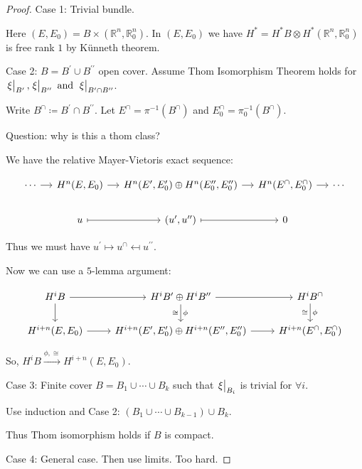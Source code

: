 \documentclass{article}
\theoremstyle{definition}
\begin{document}
    \begin{proof}
        Case 1: Trivial bundle.

        Here \((E, E_0) = B \times (\mathbb{R}^n , \mathbb{R}^n_0)\). In \((E,E_0)\) we have \(H^{\ast} = H^{\ast} B \otimes H^{\ast} (\mathbb{R}^n, \mathbb{R}^n_0)\) is free rank \(1\) by K\"unneth theorem.

        Case 2: \(B = B^{\prime} \cup B^{\prime\prime}\) open cover. Assume Thom Isomorphism Theorem holds for \(\eval{\xi}_{B^{\prime}},\eval{\xi}_{B^{\prime\prime}} \text{ and } \eval{\xi}_{B^{\prime} \cap B^{\prime\prime}}\).
        
        Write \(B^\cap \coloneqq B^{\prime} \cap B^{\prime\prime}\). Let \(E^\cap = \pi ^{-1} (B^\cap)\) and \(E_0^\cap = \pi_0 ^{-1} (B^\cap)\).
        
        Question: why is this a thom class?

        We have the relative Mayer-Vietoris exact sequence:

        \[
            \begin{tikzcd}[column sep = small]
                \cdots \ar[r] & H^n(E,E_0) \ar[r] & H^n(E^{\prime}, E^{\prime}_0) \oplus H^n(E^{\prime\prime}_0 ,  E^{\prime\prime} _0) \ar[r] & H^n(E^\cap , E_0^\cap) \ar[r] & \cdots \\
                & u \ar[r, mapsto] & (u^{\prime}, u^{\prime\prime}) \ar[r, mapsto] & 0
            \end{tikzcd}
        \]

        Thus we must have \(u^{\prime} \mapsto u^\cap \mapsfrom u^{\prime\prime}\).
        
        Now we can use a \(5\)-lemma argument:
        
        \[
            \begin{tikzcd}
                H^i B \ar[r] \ar[d] & H^i B^{\prime} \oplus H^i B^{\prime\prime} \ar[r] \ar[d, "\phi", "\cong"'] & H^i B^\cap \ar[d, "\phi", "\cong"'] \\
                H^{i+n} (E,E_0) \ar[r] & H^{i+n} (E^{\prime} , E^{\prime}_0) \oplus H^{i+n} (E^{\prime\prime}, E^{\prime\prime}_0) \ar[r] & H^{i+n} (E^\cap, E_0^\cap)
            \end{tikzcd}
        \]

        So, \(H^i B \xrightarrow{\phi, \cong} H^{i+n}(E,E_0)\).

        Case 3: Finite cover \(B = B_1 \cup \cdots \cup B_k\) such that \(\eval{\xi}_{B_i}\) is trivial for \(\forall i\).
        
        Use induction and Case 2: \((B_1 \cup \cdots \cup B_{k-1})\cup B_k\).
        
        Thus Thom isomorphism holds if \(B\) is compact.

        Case 4: General case. Then use limits. Too hard.

    \end{proof}
\end{document}
